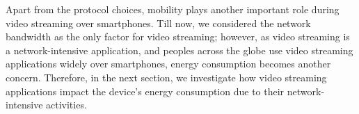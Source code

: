 Apart from the protocol choices, mobility plays another important role during video streaming over smartphones. Till now, we considered the network bandwidth as the only factor for video streaming; however, as video streaming is a network-intensive application, and peoples across the globe use video streaming applications widely over smartphones, energy consumption becomes another concern. Therefore, in the next section, we investigate how video streaming applications impact the device's energy consumption due to their network-intensive activities.




